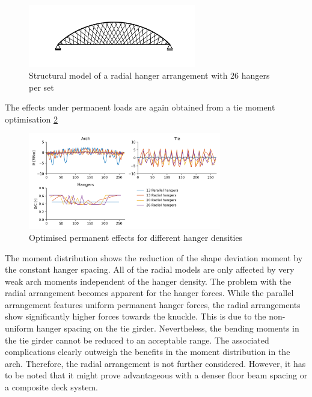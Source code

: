 \begin{figure}[H]
    \centering
    \includegraphics[trim={0 1cm 0 1cm},clip, width=0.65\textwidth]{calculations/hanger density radial/structure_26_radial.png}
    \caption{Structural model of a radial hanger arrangement with 26 hangers per set}
    \label{fig:structure_26_radial}
\end{figure}

The effects under permanent loads are again obtained from a tie moment optimisation
\cref{fig:hd_permanent_radial}

\begin{figure}[H]
    \centering
    \includegraphics[trim={0 0 0 0},clip, width=0.75\textwidth]{calculations/hanger density radial/permanent.png}
    \caption{Optimised permanent effects for different hanger densities}
    \label{fig:hd_permanent_radial}
\end{figure}

The moment distribution shows the reduction of the shape deviation moment by the constant hanger spacing. All of the radial models are only affected by very weak arch moments independent of the hanger density. The problem with the radial arrangement becomes apparent for the hanger forces. While the parallel arrangement features uniform permanent hanger forces, the radial arrangements show significantly higher forces towards the knuckle. This is due to the non-uniform hanger spacing on the tie girder. Nevertheless, the bending moments in the tie girder cannot be reduced to an acceptable range. The associated complications clearly outweigh the benefits in the moment distribution in the arch. Therefore, the radial arrangement is not further considered. However, it has to be noted that it might prove advantageous with a denser floor beam spacing or a composite deck system.


